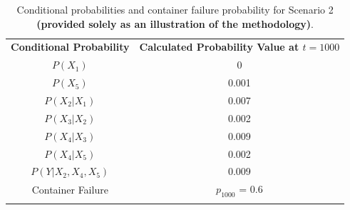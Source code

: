 \begin{table}[htbp]
\begin{center}
    \begin{tabular}{cc} \Xhline{2\arrayrulewidth}
     \textbf{Conditional Probability}          & \textbf{Calculated Probability Value at $t=1000$} \\\Xhline{2\arrayrulewidth}
    $P(X_1)$                            & 0                                     \\
    $P(X_5)$                            & 0.001                                   \\
    $P(X_2|X_1)$                         & 0.007                                   \\
    $P(X_3|X_2)$                         & 0.002                                   \\
    $P(X_4|X_3)$                         & 0.009                                   \\
    $P(X_4|X_5)$                         & 0.002                                   \\
    $P(Y|X_2,X_4,X_5)$                    & 0.009                                   \\ \hline
    Container Failure & $p_{1000}$ = 0.6                               \\\Xhline{2\arrayrulewidth}
    \end{tabular}
    \small\caption{Conditional probabilities and container failure probability for Scenario 2 \textbf{(provided solely as an illustration of the methodology)}.}\normalsize
    \label{table:time1000_probs}
    \end{center}
\end{table}
